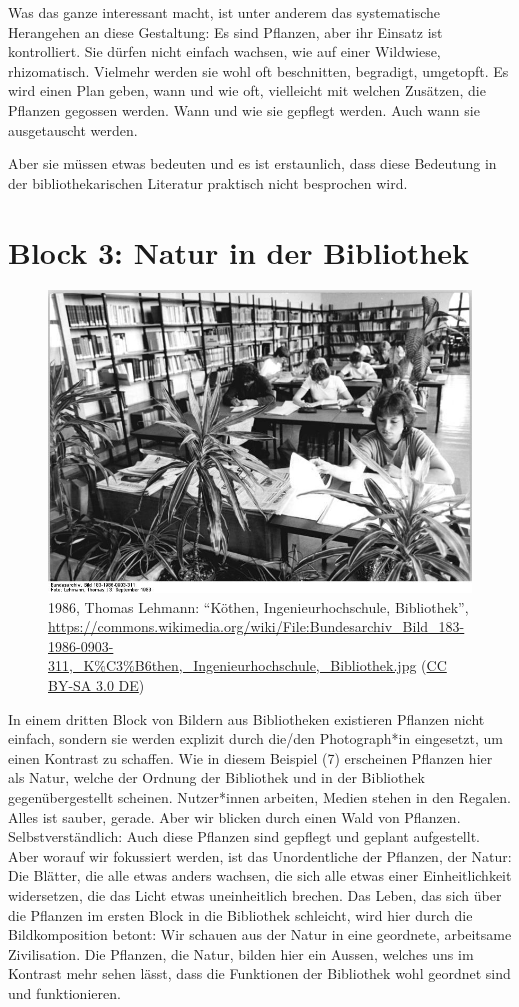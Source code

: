 \documentclass[a4paper,
fontsize=11pt,
oneside,
numbers=noperiodatend,
parskip=half-,
bibliography=totoc,
final
]{scrartcl}
\begin{document}
Was das ganze interessant macht, ist unter anderem das systematische
Herangehen an diese Gestaltung: Es sind Pflanzen, aber ihr Einsatz ist
kontrolliert. Sie dürfen nicht einfach wachsen, wie auf einer Wildwiese,
rhizomatisch. Vielmehr werden sie wohl oft beschnitten, begradigt,
umgetopft. Es wird einen Plan geben, wann und wie oft, vielleicht mit
welchen Zusätzen, die Pflanzen gegossen werden. Wann und wie sie
gepflegt werden. Auch wann sie ausgetauscht werden.

Aber sie müssen etwas bedeuten und es ist erstaunlich, dass diese
Bedeutung in der bibliothekarischen Literatur praktisch nicht besprochen
wird.

\hypertarget{block-3-natur-in-der-bibliothek}{%
\section{Block 3: Natur in der
Bibliothek}\label{block-3-natur-in-der-bibliothek}}

\begin{figure}
\centering
\includegraphics[width=0.7\columnwidth]{img/bundesarchiv-183-1986-0903-311.jpg}
\caption{1986, Thomas Lehmann: \enquote{Köthen, Ingenieurhochschule,
Bibliothek},
\url{https://commons.wikimedia.org/wiki/File:Bundesarchiv_Bild_183-1986-0903-311,_K\%C3\%B6then,_Ingenieurhochschule,_Bibliothek.jpg}
(\href{https://creativecommons.org/licenses/by-sa/3.0/de/legalcode}{CC
BY-SA 3.0 DE})}
\end{figure}

In einem dritten Block von Bildern aus Bibliotheken existieren Pflanzen
nicht einfach, sondern sie werden explizit durch die/den Photograph*in
eingesetzt, um einen Kontrast zu schaffen. Wie in diesem Beispiel (7)
erscheinen Pflanzen hier als Natur, welche der Ordnung der Bibliothek
und in der Bibliothek gegenübergestellt scheinen. Nutzer*innen arbeiten,
Medien stehen in den Regalen. Alles ist sauber, gerade. Aber wir blicken
durch einen Wald von Pflanzen. Selbstverständlich: Auch diese Pflanzen
sind gepflegt und geplant aufgestellt. Aber worauf wir fokussiert
werden, ist das Unordentliche der Pflanzen, der Natur: Die Blätter, die
alle etwas anders wachsen, die sich alle etwas einer Einheitlichkeit
widersetzen, die das Licht etwas uneinheitlich brechen. Das Leben, das
sich über die Pflanzen im ersten Block in die Bibliothek schleicht, wird
hier durch die Bildkomposition betont: Wir schauen aus der Natur in eine
geordnete, arbeitsame Zivilisation. Die Pflanzen, die Natur, bilden hier
ein Aussen, welches uns im Kontrast mehr sehen lässt, dass die
Funktionen der Bibliothek wohl geordnet sind und funktionieren.
\end{document}
